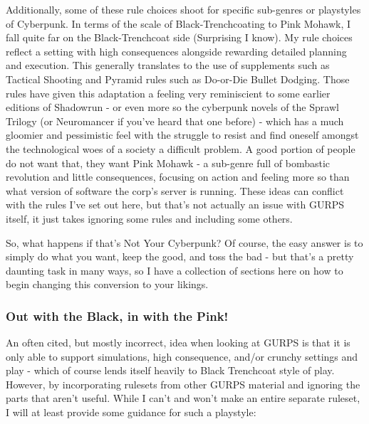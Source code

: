 \begin{multicols*}{2}
	Additionally, some of these rule choices shoot for specific sub-genres or playstyles of Cyberpunk. In terms of the scale of Black-Trenchcoating to Pink Mohawk, I fall quite far on the Black-Trenchcoat side (Surprising I know). My rule choices reflect a setting with high consequences alongside rewarding detailed planning and execution. This generally translates to the use of supplements such as Tactical Shooting and Pyramid rules such as Do-or-Die Bullet Dodging. Those rules have given this adaptation a feeling very reminiscient to some earlier editions of Shadowrun - or even more so the cyberpunk novels of the Sprawl Trilogy (or Neuromancer if you've heard that one before) - which has a much gloomier and pessimistic feel with the struggle to resist and find oneself amongst the technological woes of a society a difficult problem. A good portion of people do not want that, they want Pink Mohawk - a sub-genre full of bombastic revolution and little consequences, focusing on action and feeling more so than what version of software the corp's server is running. These ideas can conflict with the rules I've set out here, but that's not actually an issue with GURPS itself, it just takes ignoring some rules and including some others.
	
	So, what happens if that's Not Your Cyberpunk? Of course, the easy answer is to simply do what you want, keep the good, and toss the bad - but that's a pretty daunting task in many ways, so I have a collection of sections here on how to begin changing this conversion to your likings.
	
	\subsubsection{Out with the Black, in with the Pink!}
	
	An often cited, but mostly incorrect, idea when looking at GURPS is that it is only able to support simulations, high consequence, and/or crunchy settings and play - which of course lends itself heavily to Black Trenchcoat style of play. However, by incorporating rulesets from other GURPS material and ignoring the parts that aren't useful. While I can't and won't make an entire separate ruleset, I will at least provide some guidance for such a playstyle:
	

\end{multicols*}
